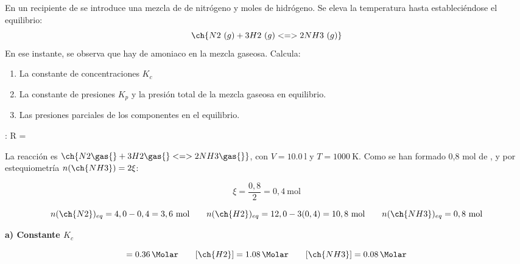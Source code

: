 \begin{exerciseEVAU}
    En un recipiente de  se introduce una mezcla de  de nitrógeno y  moles de hidrógeno. Se eleva la temperatura hasta  estableciéndose el equilibrio:
    \begin{equation*}
        \ch{N2\ (g) + 3 H2\ (g) <=> 2 NH3\ (g)}
    \end{equation*}
    En ese instante, se observa que hay  de amoniaco en la mezcla gaseosa.
    Calcula:
    \begin{enumerate}[label=\letraminuscula]
\item La constante de concentraciones \(K_c\)
\item La constante de presiones \(K_p\)  y la presión total de la mezcla gaseosa en equilibrio.
\item Las presiones parciales de los componentes en el equilibrio.
    \end{enumerate}
    \datos{}: R = \ctegases

    \begin{solu}

        La reacción es \(\ch{N2 \gas{} + 3 H2 \gas{} <=> 2 NH3 \gas{}}\), con \(V = \SI{10.0}{\litre}\) y \(T = \SI{1000}{\kelvin}\). Como se han formado 0,8 mol de , y por estequiometría \(n(\ch{NH3}) = 2\xi\):

        \begin{equation*}
            \xi = \dfrac{0,8}{2} = 0,4 \ \text{mol}
        \end{equation*}

        \begin{equation*}
            n(\ch{N2})_{eq} = 4,0 - 0,4 = 3,6 \ \text{mol} \qquad n(\ch{H2})_{eq} = 12,0 - 3(0,4) = 10,8 \ \text{mol} \qquad n(\ch{NH3})_{eq} = 0,8 \ \text{mol}
        \end{equation*}

        \textbf{a) Constante \(K_c\)}

        \begin{equation*}
            [\ch{N2}] = \SI{0.36}{\Molar} \qquad [\ch{H2}] = \SI{1.08}{\Molar} \qquad [\ch{NH3}] = \SI{0.08}{\Molar}
        \end{equation*}


\end{solu}
\end{exerciseEVAU}

